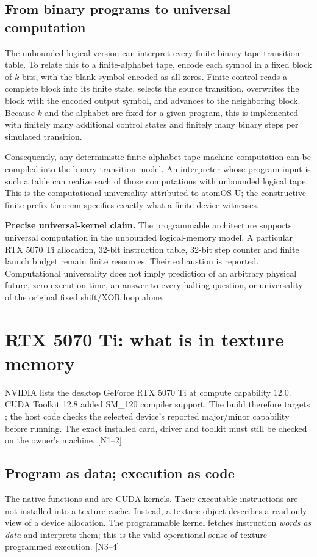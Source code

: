 \documentclass[11pt,a4paper]{article}
\newcommand{\ext}[1]{\textcolor{muted}{[N#1]}}
\newcommand{\code}[1]{\texttt{\detokenize{#1}}}
\begin{document}
\subsection{From binary programs to universal computation}
The unbounded logical version can interpret every finite binary-tape transition table. To relate this to a finite-alphabet tape, encode each symbol in a fixed block of $k$ bits, with the blank symbol encoded as all zeros. Finite control reads a complete block into its finite state, selects the source transition, overwrites the block with the encoded output symbol, and advances to the neighboring block. Because $k$ and the alphabet are fixed for a given program, this is implemented with finitely many additional control states and finitely many binary steps per simulated transition.

Consequently, any deterministic finite-alphabet tape-machine computation can be compiled into the binary transition model. An interpreter whose program input is such a table can realize each of those computations with unbounded logical tape. This is the computational universality attributed to atomOS-U; the constructive finite-prefix theorem specifies exactly what a finite device witnesses.

\begin{contract}
\textbf{Precise universal-kernel claim.} The programmable architecture supports universal computation in the unbounded logical-memory model. A particular RTX 5070 Ti allocation, 32-bit instruction table, 32-bit step counter and finite launch budget remain finite resources. Their exhaustion is reported. Computational universality does not imply prediction of an arbitrary physical future, zero execution time, an answer to every halting question, or universality of the original fixed shift/XOR loop alone.
\end{contract}
\clearpage

\section{RTX 5070 Ti: what is in texture memory}
NVIDIA lists the desktop GeForce RTX 5070 Ti at compute capability 12.0. CUDA Toolkit 12.8 added SM\_120 compiler support. The build therefore targets \code{120}; the host code checks the selected device's reported major/minor capability before running. The exact installed card, driver and toolkit must still be checked on the owner's machine. \ext{1--2}

\subsection{Program as data; execution as code}
The native functions \code{mitosis_texture} and \code{universal_texture} are CUDA kernels. Their executable instructions are not installed into a texture cache. Instead, a texture object describes a read-only view of a device allocation. The programmable kernel fetches instruction \emph{words as data} and interprets them; this is the valid operational sense of texture-programmed execution. \ext{3--4}
\end{document}
